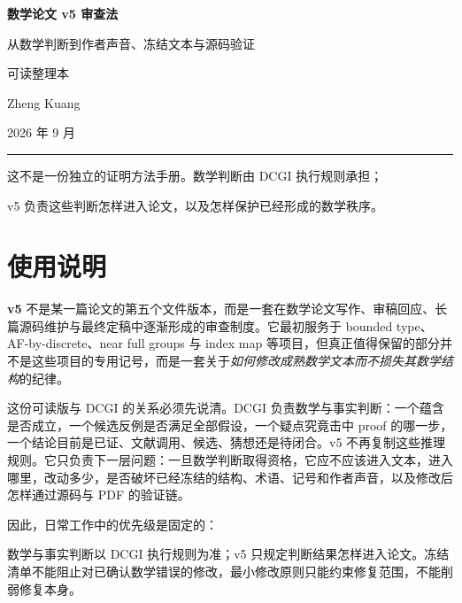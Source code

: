 \documentclass[UTF8,fontset=none,12pt,openany]{ctexbook}
\newcommand{\vfive}{\textbf{v5}}
\begin{document}
\frontmatter
\begin{titlepage}
\thispagestyle{empty}
\begin{center}
\vspace*{2.2cm}
{\fontsize{28}{34}\selectfont\bfseries\color{deepblue} 数学论文 v5 审查法}\par
\vspace{0.65cm}
{\Large 从数学判断到作者声音、冻结文本与源码验证}\par
\vspace{1.3cm}
{\large 可读整理本}\par
\vfill
{\large Zheng Kuang}\par
\vspace{0.35cm}
{\normalsize 2026 年 9 月}\par
\vspace{1.8cm}
\rule{0.72\textwidth}{0.5pt}\par
\vspace{0.5cm}
{\small 这不是一份独立的证明方法手册。数学判断由 DCGI 执行规则承担；\par
v5 负责这些判断怎样进入论文，以及怎样保护已经形成的数学秩序。}
\end{center}
\end{titlepage}

\chapter*{使用说明}

\vfive{} 不是某一篇论文的第五个文件版本，而是一套在数学论文写作、审稿回应、长篇源码维护与最终定稿中逐渐形成的审查制度。它最初服务于 bounded type、AF-by-discrete、near full groups 与 index map 等项目，但真正值得保留的部分并不是这些项目的专用记号，而是一套关于\emph{如何修改成熟数学文本而不损失其数学结构}的纪律。

这份可读版与 DCGI 的关系必须先说清。DCGI 负责数学与事实判断：一个蕴含是否成立，一个候选反例是否满足全部假设，一个疑点究竟击中 proof 的哪一步，一个结论目前是已证、文献调用、候选、猜想还是待闭合。v5 不再复制这些推理规则。它只负责下一层问题：一旦数学判断取得资格，它应不应该进入文本，进入哪里，改动多少，是否破坏已经冻结的结构、术语、记号和作者声音，以及修改后怎样通过源码与 PDF 的验证链。

因此，日常工作中的优先级是固定的：

\begin{principle}[冲突裁决]
数学与事实判断以 DCGI 执行规则为准；v5 只规定判断结果怎样进入论文。冻结清单不能阻止对已确认数学错误的修改，最小修改原则只能约束修复范围，不能削弱修复本身。
\end{principle}
\end{document}

